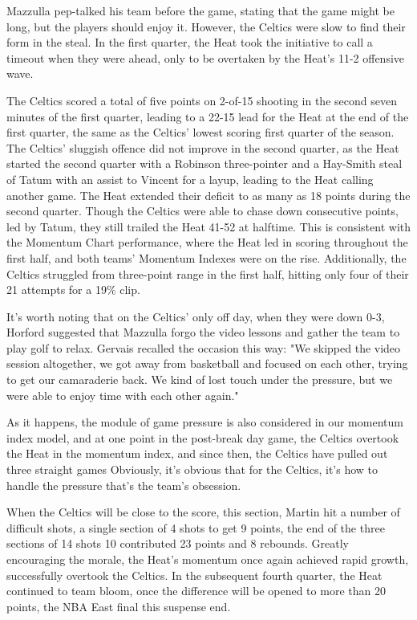\documentclass[12pt]{article}  %
\begin{document}
Mazzulla pep-talked his team before the game, stating that the game might be long, but the players should enjoy it. However, the Celtics were slow to find their form in the steal. In the first quarter, the Heat took the initiative to call a timeout when they were ahead, only to be overtaken by the Heat's 11-2 offensive wave.

The Celtics scored a total of five points on 2-of-15 shooting in the second seven minutes of the first quarter, leading to a 22-15 lead for the Heat at the end of the first quarter, the same as the Celtics' lowest scoring first quarter of the season. The Celtics' sluggish offence did not improve in the second quarter, as the Heat started the second quarter with a Robinson three-pointer and a Hay-Smith steal of Tatum with an assist to Vincent for a layup, leading to the Heat calling another game. The Heat extended their deficit to as many as 18 points during the second quarter. Though the Celtics were able to chase down consecutive points, led by Tatum, they still trailed the Heat 41-52 at halftime. This is consistent with the Momentum Chart performance, where the Heat led in scoring throughout the first half, and both teams' Momentum Indexes were on the rise. Additionally, the Celtics struggled from three-point range in the first half, hitting only four of their 21 attempts for a 19\% clip.

It's worth noting that on the Celtics' only off day, when they were down 0-3, Horford suggested that Mazzulla forgo the video lessons and gather the team to play golf to relax. Gervais recalled the occasion this way: "We skipped the video session altogether, we got away from basketball and focused on each other, trying to get our camaraderie back. We kind of lost touch under the pressure, but we were able to enjoy time with each other again."

As it happens, the module of game pressure is also considered in our momentum index model, and at one point in the post-break day game, the Celtics overtook the Heat in the momentum index, and since then, the Celtics have pulled out three straight games Obviously, it's obvious that for the Celtics, it's how to handle the pressure that's the team's obsession.

When the Celtics will be close to the score, this section, Martin hit a number of difficult shots, a single section of 4 shots to get 9 points, the end of the three sections of 14 shots 10 contributed 23 points and 8 rebounds. Greatly encouraging the morale, the Heat's momentum once again achieved rapid growth, successfully overtook the Celtics. In the subsequent fourth quarter, the Heat continued to team bloom, once the difference will be opened to more than 20 points, the NBA East final this suspense end.
\end{document}
